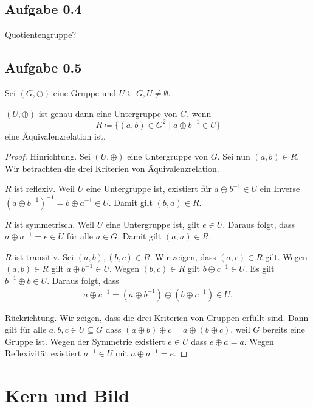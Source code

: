 \subsection*{Aufgabe 0.4}
Quotientengruppe?
\subsection*{Aufgabe 0.5}
Sei \((G, \oplus)\) eine Gruppe und \(U \subseteq G, U \ne \emptyset\).
\begin{Behauptung}
  \((U, \oplus)\) ist genau dann eine Untergruppe von \(G\), wenn \[R \coloneq
  \{(a, b) \in G^{2} \mid a \oplus b^{-1} \in U\}\] eine Äquivalenzrelation ist.
\end{Behauptung}
\begin{proof}
  Hinrichtung.  Sei \((U, \oplus)\) eine Untergruppe von \(G\).  Sei nun
  \((a, b) \in R\).  Wir betrachten die drei Kriterien von
  Äquivalenzrelation.

  \(R\) ist reflexiv.  Weil \(U\) eine Untergruppe ist, existiert für
  \(a \oplus b^{-1} \in U\) ein Inverse \((a \oplus b^{-1})^{-1} = b \oplus a^{-1} \in
  U\).  Damit gilt \((b, a) \in R\).

  \(R\) ist symmetrisch.   Weil \(U\) eine Untergruppe ist, gilt \(e \in
  U\).  Daraus folgt, dass \(a \oplus a^{-1} = e \in U\) für alle \(a \in G\).
  Damit gilt \((a, a) \in R\).

  \(R\) ist transitiv.  Sei \((a, b), (b, c) \in R\).  Wir zeigen, dass
  \((a, c) \in R\) gilt.  Wegen \((a, b) \in R\) gilt \(a \oplus b^{-1} \in U\).
  Wegen \((b, c) \in R\) gilt \(b \oplus c^{-1} \in U\).  Es gilt \(b^{-1} \oplus b
  \in U\).  Daraus folgt, dass
  \begin{align*}
    a \oplus c^{-1} = (a \oplus b^{-1}) \oplus (b \oplus c^{-1}) \in U.
  \end{align*}

  Rückrichtung.  Wir zeigen, dass die drei Kriterien von Gruppen
  erfüllt sind.  Dann gilt für alle \(a, b, c \in U \subseteq G\) dass
  \((a \oplus b) \oplus c = a \oplus (b \oplus c)\), weil \(G\) bereits eine Gruppe ist.
  Wegen der Symmetrie existiert \(e \in U\) dass \(e \oplus a = a\).  Wegen
  Reflexivität existiert \(a^{-1} \in U\) mit \(a \oplus a^{-1} = e\).
\end{proof}

\section*{Kern und Bild}
